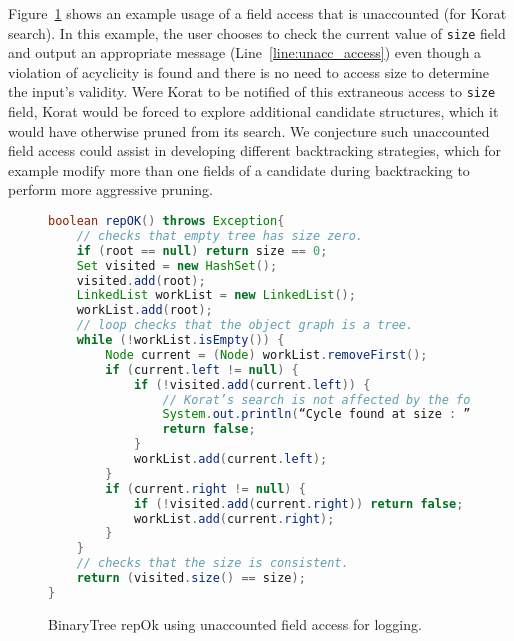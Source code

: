 Figure~\ref{fig:bTreeUnaccountedFieldAccess} shows an example usage of
a field access that is unaccounted (for Korat search).  In this
example, the user chooses to check the current value of \texttt{size}
field and output an appropriate message (Line~\ref{line:unacc_access}) even though a
violation of acyclicity is found and there is no need to access size
to determine the input's validity.  Were Korat to be notified of this
extraneous access to \texttt{size} field, Korat would be forced to
explore additional candidate structures, which it would have otherwise
pruned from its search.  We conjecture such unaccounted field access
could assist in developing different backtracking strategies, which
for example modify more than one fields of a candidate during
backtracking to perform more aggressive pruning.

\begin{figure}
\centering
\begin{lstlisting}[language=Java,escapechar=|]
boolean repOK() throws Exception{
    // checks that empty tree has size zero.
    if (root == null) return size == 0;
    Set visited = new HashSet();
    visited.add(root);
    LinkedList workList = new LinkedList();
    workList.add(root);
    // loop checks that the object graph is a tree.
    while (!workList.isEmpty()) {
        Node current = (Node) workList.removeFirst();
        if (current.left != null) {
            if (!visited.add(current.left)) {
                // Korat’s search is not affected by the following unaccounted access
                System.out.println(“Cycle found at size : ” + (int)ReflectionUtils.unaccountedAccess(this,”size”));|\label{line:unacc_access}|
                return false;
            }
            workList.add(current.left);
        }
        if (current.right != null) {
            if (!visited.add(current.right)) return false;
            workList.add(current.right);
        }
    }
    // checks that the size is consistent.
    return (visited.size() == size);
}
\end{lstlisting}
\caption{BinaryTree repOk using unaccounted field access for logging.}
\label{fig:bTreeUnaccountedFieldAccess}
\end{figure}

